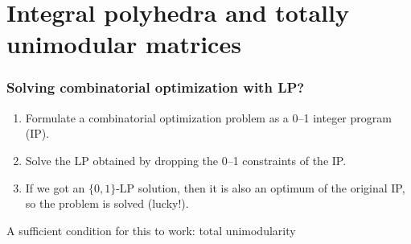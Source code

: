\documentclass[14pt,aspectratio=169,xcolor=dvipsnames,table,onlytextwidth]{beamer}
\begin{document}
\section{Integral polyhedra and totally unimodular matrices}
\begin{frame}
    \frametitle{Solving combinatorial optimization with LP?}

    \begin{enumerate}
        \setlength{\itemsep}{1em}
        \item Formulate a combinatorial optimization problem as a \alert{0--1 integer program (IP)}.
        \item Solve the LP obtained by dropping the 0--1 constraints of the IP.
        \item If we got an $\{0,1\}$-LP solution, then it is also an optimum of the original IP, so the problem is solved (lucky!).
    \end{enumerate}

    \vfill
    A sufficient condition for this to work: \alert{total unimodularity}
\end{frame}
\end{document}
